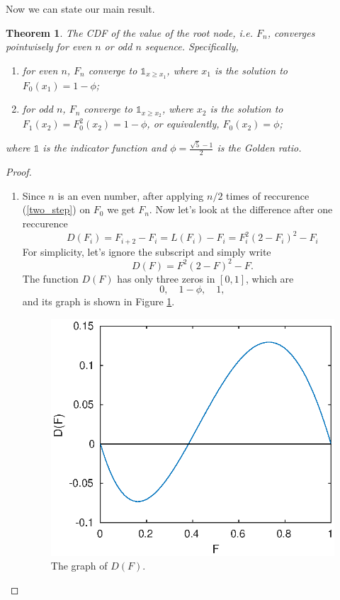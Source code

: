 \documentclass[a4paper,english]{article}
\newtheorem{thm}{Theorem}[section]
\begin{document}
\begin{spacing}{1.4}
Now we can state our main result.

\begin{thm} \label{convergence}
The CDF of the value of the root node, i.e. $F_n$, converges pointwisely for even $n$ or odd $n$ sequence. Specifically,
\begin{enumerate}
  \item for even $n$, $F_n$ converge to $\mathds{1}_{x \geq x_1}$, where $x_1$ is the solution to $F_0(x_1) = 1 - \phi$;
  \item for odd $n$, $F_n$ converge to $\mathds{1}_{x \geq x_2}$, where $x_2$ is the solution to $F_1(x_2) = F_0^2(x_2) = 1 - \phi$, or equivalently, $F_0(x_2) = \phi$;
\end{enumerate}
where $\mathds{1}$ is the indicator function and $\phi = \frac{\sqrt{5}-1}{2}$ is the Golden ratio.
\end{thm}

\begin{proof}
  \begin{enumerate}
    \item Since $n$ is an even number, after applying $n/2$ times of reccurence (\ref{two_step}) on $F_0$ we get $F_n$. Now let's look at the difference after one reccurence
    \begin{equation}
      D(F_i) = F_{i+2} - F_i = L(F_i) - F_i = F_i^2 (2 - F_i)^2 - F_i
    \end{equation}
    For simplicity, let's ignore the subscript and simply write
    \begin{equation}
      D(F) = F^2 (2 - F)^2 - F.
    \end{equation}
    The function $D(F)$ has only three zeros in $[0, 1]$, which are
    \begin{equation}
      0, \quad 1 - \phi, \quad 1,
    \end{equation}
    and its graph is shown in Figure \ref{D_F}.
    \begin{figure}[!htb] \centering
      \includegraphics[width=0.4\columnwidth]{figures/D_F.eps}
      \caption{The graph of $D(F)$.}
      \label{D_F}
    \end{figure}


\end{enumerate}
\end{proof}
\end{spacing}
\end{document}
